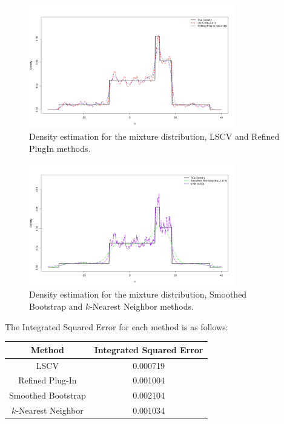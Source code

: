\documentclass{article}
\begin{document}
\begin{figure}[H]
  \centering
  \includegraphics[width=0.8\textwidth]{density_estimation_comparison_p1.png}
  \caption{Density estimation for the mixture distribution, LSCV and Refined Plug\-In methods.}
\end{figure}

\begin{figure}[H]
  \centering
  \includegraphics[width=0.8\textwidth]{density_estimation_comparison_p2.png}
  \caption{Density estimation for the mixture distribution, Smoothed Bootstrap and \(k\)-Nearest Neighbor methods.}
\end{figure}

The Integrated Squared Error for each method is as follows:

\begin{table}[H]
\centering
\begin{tabular}{|c|c|}
\hline
\textbf{Method} & \textbf{Integrated Squared Error} \\ \hline
LSCV & 0.000719 \\ \hline
Refined Plug-In & 0.001004 \\ \hline
Smoothed Bootstrap & 0.002104 \\ \hline
\(k\)-Nearest Neighbor & 0.001034 \\ \hline
\end{tabular}
\end{table}
\end{document}
